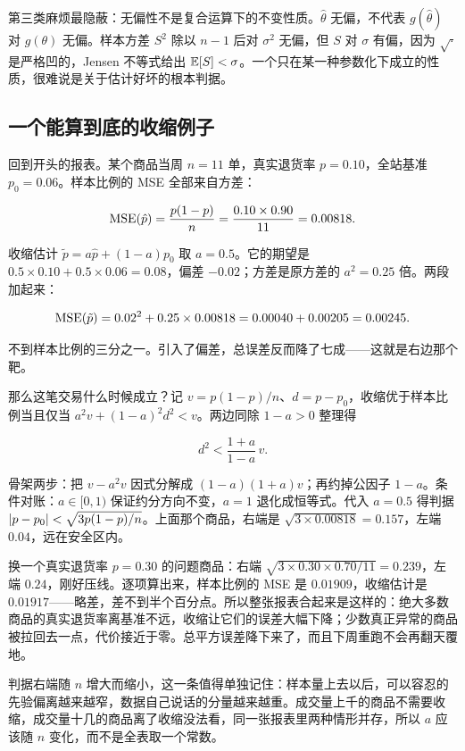 第三类麻烦最隐蔽：无偏性不是复合运算下的不变性质。\(\hat\theta\) 无偏，不代表 \(g(\hat\theta)\) 对 \(g(\theta)\) 无偏。样本方差 \(S^2\) 除以 \(n-1\) 后对 \(\sigma^2\) 无偏，但 \(S\) 对 \(\sigma\) 有偏，因为 \(\sqrt{\cdot}\) 是严格凹的，Jensen 不等式给出 \(\mathbb{E}[S]<\sigma\)。一个只在某一种参数化下成立的性质，很难说是关于估计好坏的根本判据。

\subsection{一个能算到底的收缩例子}

回到开头的报表。某个商品当周 \(n=11\) 单，真实退货率 \(p=0.10\)，全站基准 \(p_0=0.06\)。样本比例的 MSE 全部来自方差：

\[
\operatorname{MSE}(\hat p)=\frac{p(1-p)}{n}=\frac{0.10\times 0.90}{11}=0.00818 .
\]

收缩估计 \(\tilde p=a\hat p+(1-a)p_0\) 取 \(a=0.5\)。它的期望是 \(0.5\times 0.10+0.5\times 0.06=0.08\)，偏差 \(-0.02\)；方差是原方差的 \(a^2=0.25\) 倍。两段加起来：

\[
\operatorname{MSE}(\tilde p)=0.02^2+0.25\times 0.00818=0.00040+0.00205=0.00245 .
\]

不到样本比例的三分之一。引入了偏差，总误差反而降了七成——这就是右边那个靶。

那么这笔交易什么时候成立？记 \(v=p(1-p)/n\)、\(d=p-p_0\)，收缩优于样本比例当且仅当 \(a^2v+(1-a)^2d^2<v\)。两边同除 \(1-a>0\) 整理得

\[
d^2<\frac{1+a}{1-a}\,v .
\]

骨架两步：把 \(v-a^2v\) 因式分解成 \((1-a)(1+a)v\)；再约掉公因子 \(1-a\)。条件对账：\(a\in[0,1)\) 保证约分方向不变，\(a=1\) 退化成恒等式。代入 \(a=0.5\) 得判据 \(\left|p-p_0\right|<\sqrt{3p(1-p)/n}\)。上面那个商品，右端是 \(\sqrt{3\times 0.00818}=0.157\)，左端 \(0.04\)，远在安全区内。

换一个真实退货率 \(p=0.30\) 的问题商品：右端 \(\sqrt{3\times 0.30\times 0.70/11}=0.239\)，左端 \(0.24\)，刚好压线。逐项算出来，样本比例的 MSE 是 \(0.01909\)，收缩估计是 \(0.01917\)——略差，差不到半个百分点。所以整张报表合起来是这样的：绝大多数商品的真实退货率离基准不远，收缩让它们的误差大幅下降；少数真正异常的商品被拉回去一点，代价接近于零。总平方误差降下来了，而且下周重跑不会再翻天覆地。

判据右端随 \(n\) 增大而缩小，这一条值得单独记住：样本量上去以后，可以容忍的先验偏离越来越窄，数据自己说话的分量越来越重。成交量上千的商品不需要收缩，成交量十几的商品离了收缩没法看，同一张报表里两种情形并存，所以 \(a\) 应该随 \(n\) 变化，而不是全表取一个常数。

